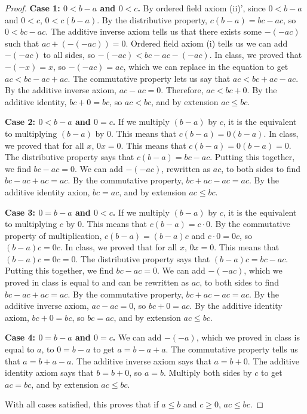 \documentclass[11pt]{article}
\begin{document}
\begin{proof}
        \textbf{Case 1: $0 < b - a$ and $0 < c$.}
        By ordered field axiom (ii)', since $0 < b - a$ and $0 < c$, $0 < c(b - a)$.
        By the distributive property, $c(b - a) = bc - ac$, so $0 < bc - ac$.
        The additive inverse axiom tells us that there exists some $-(-ac)$ such that $ac + (-(-ac)) = 0$.
        Ordered field axiom (i) tells us we can add $-(-ac)$ to all sides, so $-(-ac) < bc - ac - (-ac)$.
        In class, we proved that $-(-x) = x$, so $-(-ac) = ac$, which we can replace in the equation to get $ac < bc - ac + ac$.
        The commutative property lets us say that $ac < bc + ac - ac$.
        By the additive inverse axiom, $ac - ac = 0$.
        Therefore, $ac < bc + 0$.
        By the additive identity, $bc + 0 = bc$, so $ac < bc$, and by extension $ac \leq bc$.

        \textbf{Case 2: $0 < b - a$ and $0 = c$.}
        If we multiply $(b - a)$ by $c$, it is the equivalent to multiplying $(b - a)$ by $0$.
        This means that $c(b - a) = 0(b - a)$.
        In class, we proved that for all $x$, $0x = 0$.
        This means that $c(b - a) = 0(b - a) = 0$.
        The distributive property says that $c(b - a) = bc - ac$.
        Putting this together, we find $bc - ac = 0$.
        We can add $-(-ac)$, rewritten as $ac$, to both sides to find $bc - ac + ac = ac$.
        By the commutative property, $bc + ac - ac = ac$.
        By the additive identity axion, $bc = ac$, and by extension $ac \leq bc$.

        \textbf{Case 3: $0 = b - a$ and $0 < c$.}
        If we multiply $(b - a)$ by $c$, it is the equivalent to multiplying $c$ by $0$.
        This means that $c(b - a) = c \cdot 0$.
        By the commutative property of multiplication, $c(b - a) = (b - a)c$ and $c \cdot 0 = 0c$, so $(b - a)c = 0c$.
        In class, we proved that for all $x$, $0x = 0$.
        This means that $(b - a)c = 0c = 0$.
        The distributive property says that $(b - a)c = bc - ac$.
        Putting this together, we find $bc - ac = 0$.
        We can add $-(-ac)$, which we proved in class is equal to and can be rewritten as $ac$, to both sides to find $bc - ac + ac = ac$.
        By the commutative property, $bc + ac - ac = ac$.
        By the additive inverse axiom, $ac - ac = 0$, so $bc + 0 = ac$.
        By the additive identity axiom, $bc + 0 = bc$, so $bc = ac$, and by extension $ac \leq bc$.

        \textbf{Case 4: $0 = b - a$ and $0 = c$.}
        We can add $-(-a)$, which we proved in class is equal to $a$, to $0 = b - a$ to get $a = b - a + a$.
        The commutative property tells us that $a = b + a - a$.
        The additive inverse axiom says that $a = b + 0$.
        The additive identity axiom says that $b = b + 0$, so $a = b$.
        Multiply both sides by $c$ to get $ac = bc$, and by extension $ac \leq bc$.

        With all cases satisfied, this proves that if $a \leq b$ and $c \geq 0$, $ac \leq bc$.
    \end{proof}
\end{document}
